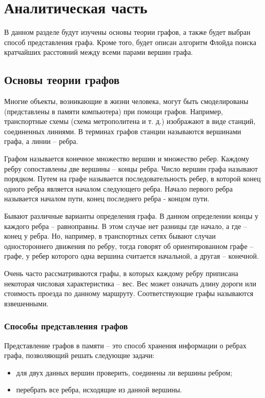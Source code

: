 \chapter{Аналитическая часть}

В данном разделе будут изучены основы теории графов, а также будет выбран способ представления графа. Кроме того, будет описан алгоритм Флойда поиска кратчайших расстояний между всеми парами вершин графа.

\section{Основы теории графов}

Многие объекты, возникающие в жизни человека, могут быть смоделированы (представлены в памяти компьютера) при помощи графов. Например, транспортные схемы (схема метрополитена и т. д.) изображают в виде станций, соединенных линиями. В терминах графов станции называются вершинами графа, а линии – ребра.

Графом \cite{graph} называется конечное множество вершин и множество ребер. Каждому ребру сопоставлены две вершины – концы ребра. Число вершин графа называют порядком. Путем на графе называется последовательность ребер, в которой конец одного ребра является началом следующего ребра. Начало первого ребра называется началом пути, конец последнего ребра - концом пути.

Бывают различные варианты определения графа. В данном определении концы у каждого ребра – равноправны. В этом случае нет разницы где начало, а где – конец у ребра. Но, например, в транспортных сетях бывают случаи одностороннего движения по ребру, тогда говорят об ориентированном графе – графе, у ребер которого одна вершина считается начальной, а другая – конечной.

Очень часто рассматриваются графы, в которых каждому ребру приписана некоторая числовая характеристика – вес. Вес может означать длину дороги или стоимость проезда по данному маршруту. Соответствующие графы называются взвешенными.

\subsection{Способы представления графов}

Представление графов в памяти – это способ хранения информации о ребрах графа, позволяющий решать следующие задачи:

\begin{itemize}
	\item для двух данных вершин проверить, соединены ли вершины ребром;
	\item перебрать все ребра, исходящие из данной вершины.
\end{itemize}

